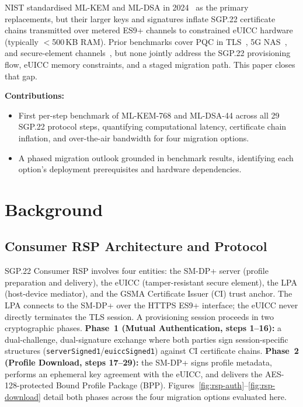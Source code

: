 \documentclass[final,3p,times,twocolumn]{elsarticle}
\begin{document}
NIST standardised ML-KEM and ML-DSA in 2024~\citep{nist2024pqc} as the
primary replacements, but their larger keys and signatures inflate SGP.22
certificate chains transmitted over metered ES9+ channels to constrained eUICC
hardware (typically $<$500\,KB RAM).  Prior benchmarks cover PQC in
TLS~\citep{schwabe2020kemtls,sikeridis2020pqtls}, 5G NAS~\citep{hoque2025pqc5g},
and secure-element channels~\citep{bettale2025pqesim}, but none jointly address
the SGP.22 provisioning flow, eUICC memory constraints, and a staged migration
path. This paper closes that gap.

\noindent\textbf{Contributions:}
\begin{itemize}[leftmargin=*, noitemsep, topsep=2pt]
  \item First per-step benchmark of ML-KEM-768 and ML-DSA-44 across all
        29 SGP.22 protocol steps, quantifying computational latency, certificate
        chain inflation, and over-the-air bandwidth for four migration options.
  \item A phased migration outlook grounded in benchmark results, identifying
        each option's deployment prerequisites and hardware dependencies.
\end{itemize}

\section{Background}\label{sec:background}

\subsection{Consumer RSP Architecture and Protocol}\label{sec:bg-arch}

SGP.22 Consumer RSP involves four entities: the SM-DP+ server (profile
preparation and delivery), the eUICC (tamper-resistant secure element), the
LPA (host-device mediator), and the GSMA Certificate Issuer (CI) trust
anchor.  The LPA connects to the SM-DP+ over the HTTPS ES9+ interface;
the eUICC never directly terminates the TLS session.
A provisioning session proceeds in two cryptographic phases.
\textbf{Phase~1 (Mutual Authentication, steps 1--16):} a dual-challenge,
dual-signature exchange where both parties sign session-specific structures
(\texttt{serverSigned1}/\texttt{euiccSigned1}) against CI certificate chains.
\textbf{Phase~2 (Profile Download, steps 17--29):} the SM-DP+ signs profile
metadata, performs an ephemeral key agreement with the eUICC, and delivers the
AES-128-protected Bound Profile Package (BPP).
Figures~\ref{fig:rsp-auth}--\ref{fig:rsp-download} detail both phases across
the four migration options evaluated here.
\end{document}
